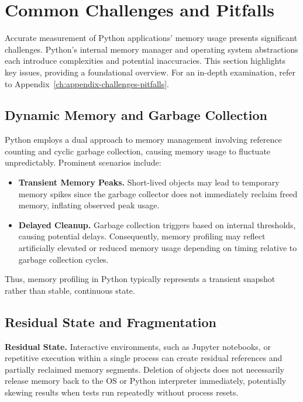 \section{Common Challenges and Pitfalls}
\label{sec:mmc-common-challenges-and-pitfalls}

Accurate measurement of Python applications' memory usage presents significant challenges.
Python’s internal memory manager and operating system abstractions each introduce complexities and potential inaccuracies.
This section highlights key issues, providing a foundational overview.
For an in-depth examination, refer to Appendix~\ref{ch:appendix-challenges-pitfalls}.

\subsection{Dynamic Memory and Garbage Collection}
\label{subsec:mmc-challenges-gc}

Python employs a dual approach to memory management involving reference counting and cyclic garbage collection, causing memory usage to fluctuate unpredictably.
Prominent scenarios include:

\begin{itemize}
    \item \textbf{Transient Memory Peaks.} Short-lived objects may lead to temporary memory spikes since the garbage collector does not immediately reclaim freed memory, inflating observed peak usage.
    \item \textbf{Delayed Cleanup.} Garbage collection triggers based on internal thresholds, causing potential delays. Consequently, memory profiling may reflect artificially elevated or reduced memory usage depending on timing relative to garbage collection cycles.
\end{itemize}

Thus, memory profiling in Python typically represents a transient snapshot rather than stable, continuous state.

\subsection{Residual State and Fragmentation}
\label{subsec:mmc-challenges-fragmentation}

\textbf{Residual State.} Interactive environments, such as Jupyter notebooks, or repetitive execution within a single process can create residual references and partially reclaimed memory segments.
Deletion of objects does not necessarily release memory back to the \ac{OS} or Python interpreter immediately, potentially skewing results when tests run repeatedly without process resets.

